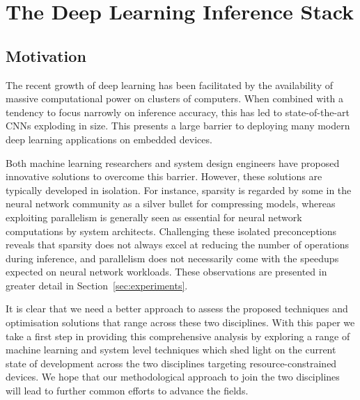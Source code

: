 \documentclass[conference]{IEEEtran}
\begin{document}
\section{The Deep Learning Inference Stack}\label{sec:stack}\subsection{Motivation}
The recent growth of deep learning has been facilitated by the availability of massive computational power on clusters of computers. When combined with a tendency to focus narrowly on inference accuracy, this has led to state-of-the-art CNNs exploding in size. This presents a large barrier to deploying many modern deep learning applications on embedded devices.

Both machine learning researchers and system design engineers have proposed innovative solutions to overcome this barrier. However, these solutions are typically developed in isolation. For instance, sparsity is regarded by some in the neural network community as a silver bullet for compressing models, whereas exploiting parallelism is generally seen as essential for neural network computations by system architects. Challenging these isolated preconceptions reveals that sparsity does not always excel at reducing the number of operations during inference, and parallelism does not necessarily come with the speedups expected on neural network workloads. These observations are presented in greater detail in Section~\ref{sec:experiments}. 

It is clear that we need a better approach to assess the proposed techniques and optimisation solutions that range across these two disciplines. With this paper we take a first step in providing this comprehensive analysis by exploring a range of machine learning and system level techniques which shed light on the current state of development across the two disciplines targeting resource-constrained devices. We hope that our methodological approach to join the two disciplines will lead to further common efforts to advance the fields.
\end{document}
